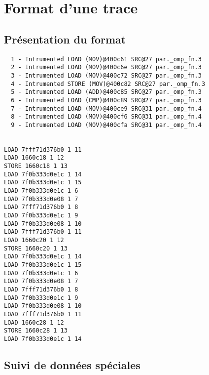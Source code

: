 \section{Format d'une trace}

\subsection{Présentation du format}
\begin{framed}
\begin{verbatim}
  1 - Intrumented LOAD (MOV)@400c61 SRC@27 par._omp_fn.3
  2 - Intrumented LOAD (MOV)@400c6e SRC@27 par._omp_fn.3
  3 - Intrumented LOAD (MOV)@400c72 SRC@27 par._omp_fn.3
  4 - Intrumented STORE (MOV)@400c82 SRC@27 par._omp_fn.3
  5 - Intrumented LOAD (ADD)@400c85 SRC@27 par._omp_fn.3
  6 - Intrumented LOAD (CMP)@400c89 SRC@27 par._omp_fn.3
  7 - Intrumented LOAD (MOV)@400ce9 SRC@31 par._omp_fn.4
  8 - Intrumented LOAD (MOV)@400cf6 SRC@31 par._omp_fn.4
  9 - Intrumented LOAD (MOV)@400cfa SRC@31 par._omp_fn.4


LOAD 7fff71d376b0 1 11
LOAD 1660c18 1 12
STORE 1660c18 1 13
LOAD 7f0b333d0e1c 1 14
LOAD 7f0b333d0e1c 1 15
LOAD 7f0b333d0e1c 1 6
LOAD 7f0b333d0e08 1 7
LOAD 7fff71d376b0 1 8
LOAD 7f0b333d0e1c 1 9
LOAD 7f0b333d0e08 1 10
LOAD 7fff71d376b0 1 11
LOAD 1660c20 1 12
STORE 1660c20 1 13
LOAD 7f0b333d0e1c 1 14
LOAD 7f0b333d0e1c 1 15
LOAD 7f0b333d0e1c 1 6
LOAD 7f0b333d0e08 1 7
LOAD 7fff71d376b0 1 8
LOAD 7f0b333d0e1c 1 9
LOAD 7f0b333d0e08 1 10
LOAD 7fff71d376b0 1 11
LOAD 1660c28 1 12
STORE 1660c28 1 13
LOAD 7f0b333d0e1c 1 14
\end{verbatim}
\end{framed}

\subsection{Suivi de données spéciales}
